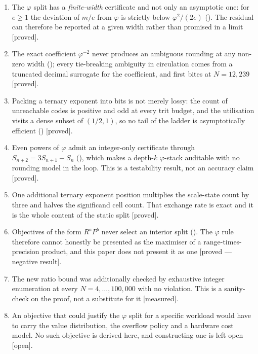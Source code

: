 \begin{enumerate}
\item The $\varphi$ split has a \emph{finite-width} certificate and not only an
asymptotic one: for $e\geq1$ the deviation of $m/e$ from $\varphi$ is strictly
below $\varphi^{2}/(2e)$ (). The residual can
therefore be reported at a given width rather than promised in a limit
[proved].

\item The exact coefficient $\varphi^{-2}$ never produces an ambiguous rounding at
any non-zero width (); every tie-breaking
ambiguity in circulation comes from a truncated decimal surrogate for the
coefficient, and first bites at $N=12{,}239$ [proved].

\item Packing a ternary exponent into bits is not merely lossy: the count of
unreachable codes is positive and odd at every trit budget, and the utilisation
visits a dense subset of $(1/2,1)$, so no tail of the ladder is asymptotically
efficient () [proved].

\item Even powers of $\varphi$ admit an integer-only certificate through
$S_{n+2}=3S_{n+1}-S_n$ (), which makes a depth-$k$
$\varphi$-stack auditable with no rounding model in the loop. This is a testability
result, not an accuracy claim [proved].

\item One additional ternary exponent position multiplies the scale-state count by
three and halves the significand cell count. That exchange rate is exact and it is
the whole content of the static split [proved].

\item Objectives of the form $R^{a}P^{b}$ never select an interior split
(). The $\varphi$ rule therefore cannot
honestly be presented as the maximiser of a range-times-precision product, and
this paper does not present it as one [proved --- negative result].

\item The new ratio bound was additionally checked by exhaustive integer
enumeration at every $N=4,\dots,100{,}000$ with no violation. This is a
sanity-check on the proof, not a substitute for it [measured].

\item An objective that could justify the $\varphi$ split for a specific workload
would have to carry the value distribution, the overflow policy and a hardware
cost model. No such objective is derived here, and constructing one is left open
[open].
\end{enumerate}

